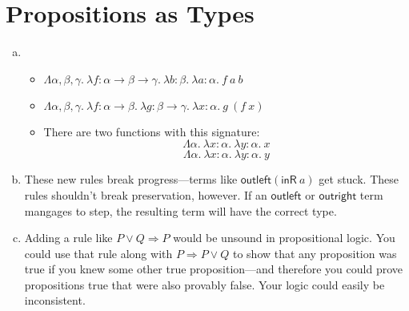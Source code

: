 \section{Propositions as Types}
\newcommand{\fun}[3]{\lambda {#1}\!:\!{#2}.~{#3}}
\newcommand{\Fun}[2]{\Lambda {#1}.~{#2}}

\begin{enumerate}[(a)]
    \item \begin{itemize}
        \item $\Fun{\alpha, \beta, \gamma}{\fun f {\alpha \rightarrow \beta \rightarrow \gamma} {\fun b \beta {\fun a \alpha {f~a~b}}}}$
        \item $\Fun{\alpha, \beta, \gamma}{\fun f {\alpha \rightarrow \beta} {\fun g {\beta \rightarrow \gamma} {\fun x \alpha {g~(f~x)}}}}$
        \item There are two functions with this signature:
            $$ \Fun \alpha {\fun x \alpha {\fun y \alpha x}} $$
            $$ \Fun \alpha {\fun x \alpha {\fun y \alpha y}} $$
    \end{itemize}
    \item These new rules break progress---terms like $\textsf{outleft} (\textsf{inR}~a)$ get stuck. These rules
    shouldn't break preservation, however. If an $\textsf{outleft}$ or $\textsf{outright}$ term mangages to step, the
    resulting term will have the correct type.
    \item Adding a rule like $P \vee Q \Rightarrow P$ would be unsound in propositional logic. You could use that rule
    along with $P \Rightarrow P \vee Q$ to show that any proposition was true if you knew some other true
    proposition---and therefore you could prove propositions true that were also provably false. Your logic could easily
    be inconsistent.
\end{enumerate}
